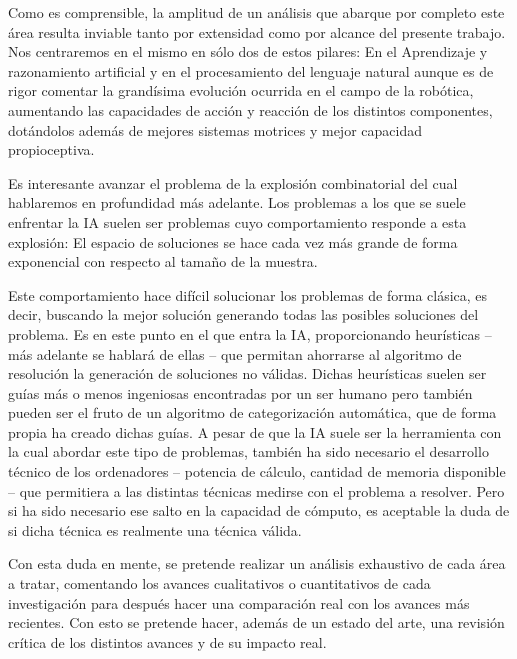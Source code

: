 Como es comprensible, la amplitud de un análisis que abarque por completo este
área resulta inviable tanto por extensidad como por alcance del presente
trabajo. Nos centraremos en el mismo en sólo dos de estos pilares: En el
Aprendizaje y razonamiento artificial y en el procesamiento del lenguaje natural
aunque es de rigor comentar la grandísima evolución ocurrida en el campo de la
robótica, aumentando las capacidades de acción y reacción de los distintos
componentes, dotándolos además de mejores sistemas motrices y mejor capacidad
propioceptiva.

Es interesante avanzar el problema de la explosión combinatorial del cual
hablaremos en profundidad más adelante. Los problemas a los que se suele
enfrentar la IA suelen ser problemas cuyo comportamiento responde a esta
explosión: El espacio de soluciones se hace cada vez más grande de forma
exponencial con respecto al tamaño de la muestra.

Este comportamiento hace difícil solucionar los problemas de forma clásica, es
decir, buscando la mejor solución generando todas las posibles soluciones del
problema. Es en este punto en el que entra la IA, proporcionando heurísticas –
más adelante se hablará de ellas – que permitan ahorrarse al algoritmo de
resolución la generación de soluciones no válidas. Dichas heurísticas suelen ser
guías más o menos ingeniosas encontradas por un ser humano pero también pueden
ser el fruto de un algoritmo de categorización automática, que de forma propia
ha creado dichas guías. A pesar de que la IA suele ser la herramienta con la
cual abordar este tipo de problemas, también ha sido necesario el desarrollo
técnico de los ordenadores – potencia de cálculo, cantidad de memoria disponible
– que permitiera a las distintas técnicas medirse con el problema a
resolver. Pero si ha sido necesario ese salto en la capacidad de cómputo, es
aceptable la duda de si dicha técnica es realmente una técnica válida.

Con esta duda en mente, se pretende realizar un análisis exhaustivo de cada área
a tratar, comentando los avances cualitativos o cuantitativos de cada
investigación para después hacer una comparación real con los avances más
recientes. Con esto se pretende hacer, además de un estado del arte, una
revisión crítica de los distintos avances y de su impacto real.

